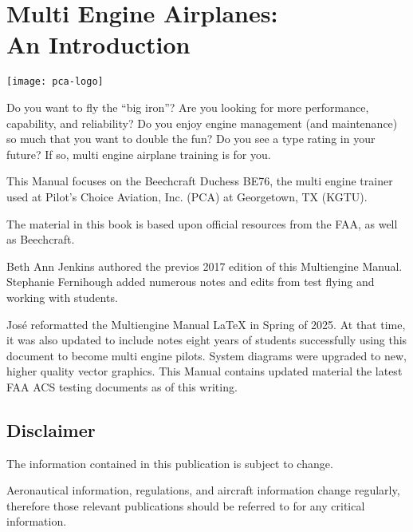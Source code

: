 \newcommand{\vyse}{\textcolor{blue}{$V_{yse}$ }}
\newcommand{\vmc}{\textcolor{red}{$V_{mc}$ }}
\newcommand{\vxse}{$V_{xse}$ }

\chapter*{Multi Engine Airplanes:\\An Introduction}

\begin{center}
\texttt{[image: pca-logo]}
\end{center}

Do you want to fly the ``big iron''? Are you looking for more performance, capability,
and reliability? Do you enjoy engine management (and maintenance) so much that you want to
double the fun? Do you see a type rating in your future? If so, multi engine airplane training is for you.

This Manual focuses on the Beechcraft Duchess BE76, the multi engine trainer used at Pilot's
Choice Aviation, Inc. (PCA) at Georgetown, TX (KGTU).

The material in this book is based upon official resources from the FAA, as well as Beechcraft.

Beth Ann Jenkins authored the previos 2017 edition of this Multiengine Manual. Stephanie Fernihough
added numerous notes and edits from test flying and working with students.

Jos\'e reformatted the Multiengine Manual \LaTeX{} in Spring of 2025. At that time, it was also
updated to include notes eight years of students successfully using this document to become multi
engine pilots. System diagrams were upgraded to new, higher quality vector graphics. This Manual
contains updated material the latest FAA ACS testing documents as of this writing.

\newpage

\section*{Disclaimer}

The information contained in this publication is subject to change.

Aeronautical information, regulations, and aircraft information change regularly, therefore those relevant
publications should be referred to for any critical information.


